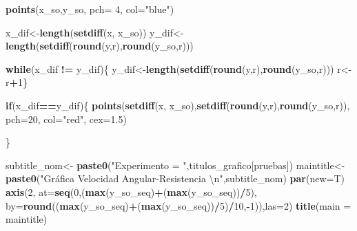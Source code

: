 \documentclass[]{article}
\newenvironment{Shaded}{\begin{snugshade}}{\end{snugshade}}
\newcommand{\KeywordTok}[1]{\textcolor[rgb]{0.13,0.29,0.53}{\textbf{#1}}}
\newcommand{\DataTypeTok}[1]{\textcolor[rgb]{0.13,0.29,0.53}{#1}}
\newcommand{\DecValTok}[1]{\textcolor[rgb]{0.00,0.00,0.81}{#1}}
\newcommand{\FloatTok}[1]{\textcolor[rgb]{0.00,0.00,0.81}{#1}}
\newcommand{\CharTok}[1]{\textcolor[rgb]{0.31,0.60,0.02}{#1}}
\newcommand{\StringTok}[1]{\textcolor[rgb]{0.31,0.60,0.02}{#1}}
\newcommand{\ControlFlowTok}[1]{\textcolor[rgb]{0.13,0.29,0.53}{\textbf{#1}}}
\newcommand{\OperatorTok}[1]{\textcolor[rgb]{0.81,0.36,0.00}{\textbf{#1}}}
\newcommand{\NormalTok}[1]{#1}
\begin{document}
\begin{Shaded}
\begin{Highlighting}[]
{{{    \KeywordTok{points}\NormalTok{(x_so,y_so, }\DataTypeTok{pch=} \DecValTok{4}\NormalTok{, }\DataTypeTok{col=}\StringTok{"blue"}\NormalTok{)}
    
    
    
\NormalTok{    x_dif<-}\KeywordTok{length}\NormalTok{(}\KeywordTok{setdiff}\NormalTok{(x, x_so))}
\NormalTok{    y_dif<-}\KeywordTok{length}\NormalTok{(}\KeywordTok{setdiff}\NormalTok{(}\KeywordTok{round}\NormalTok{(y,r),}\KeywordTok{round}\NormalTok{(y_so,r)))}
    
    
    \ControlFlowTok{while}\NormalTok{(x_dif }\OperatorTok{!=}\StringTok{ }\NormalTok{y_dif)\{}
\NormalTok{      y_dif<-}\KeywordTok{length}\NormalTok{(}\KeywordTok{setdiff}\NormalTok{(}\KeywordTok{round}\NormalTok{(y,r),}\KeywordTok{round}\NormalTok{(y_so,r)))}
\NormalTok{      r<-r}\OperatorTok{+}\DecValTok{1}\NormalTok{\}}
    
    
    \ControlFlowTok{if}\NormalTok{(x_dif}\OperatorTok{==}\NormalTok{y_dif)\{}
      \KeywordTok{points}\NormalTok{(}\KeywordTok{setdiff}\NormalTok{(x, x_so),}\KeywordTok{setdiff}\NormalTok{(}\KeywordTok{round}\NormalTok{(y,r),}\KeywordTok{round}\NormalTok{(y_so,r)), }\DataTypeTok{pch=}\DecValTok{20}\NormalTok{, }\DataTypeTok{col=}\StringTok{"red"}\NormalTok{, }\DataTypeTok{cex=}\FloatTok{1.5}\NormalTok{)}
      
\NormalTok{    \}}
    
    
    
    
    
    
\NormalTok{    subtitle_nom<-}\StringTok{ }\KeywordTok{paste0}\NormalTok{(}\StringTok{"Experimento = "}\NormalTok{,titulos_grafico[pruebas])}
\NormalTok{    maintitle<-}\StringTok{ }\KeywordTok{paste0}\NormalTok{(}\StringTok{"Gráfica Velocidad Angular-Resistencia }\CharTok{\textbackslash{}n}\StringTok{"}\NormalTok{,subtitle_nom)}
    \KeywordTok{par}\NormalTok{(}\DataTypeTok{new=}\NormalTok{T)}
    \KeywordTok{axis}\NormalTok{(}\DecValTok{2}\NormalTok{, }\DataTypeTok{at=}\KeywordTok{seq}\NormalTok{(}\DecValTok{0}\NormalTok{,(}\KeywordTok{max}\NormalTok{(y_so_seq)}\OperatorTok{+}\NormalTok{(}\KeywordTok{max}\NormalTok{(y_so_seq))}\OperatorTok{/}\DecValTok{5}\NormalTok{), }\DataTypeTok{by=}\KeywordTok{round}\NormalTok{((}\KeywordTok{max}\NormalTok{(y_so_seq)}\OperatorTok{+}\NormalTok{(}\KeywordTok{max}\NormalTok{(y_so_seq))}\OperatorTok{/}\DecValTok{5}\NormalTok{)}\OperatorTok{/}\DecValTok{10}\NormalTok{,}\OperatorTok{-}\DecValTok{1}\NormalTok{)),}\DataTypeTok{las=}\DecValTok{2}\NormalTok{)}
    \KeywordTok{title}\NormalTok{(}\DataTypeTok{main =}\NormalTok{ maintitle)}
    
}}}
\end{Highlighting}
\end{Shaded}
\end{document}
